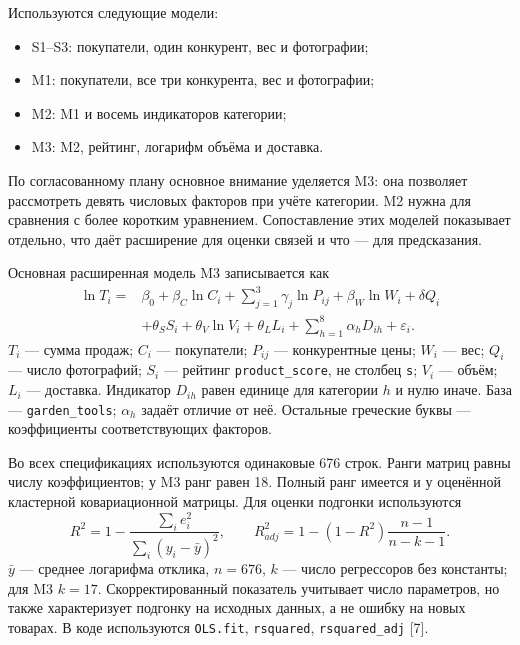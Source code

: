 \documentclass[14pt,a4paper]{extreport}
\newcommand{\resulttable}[3]{%
\begin{table}[htbp]\centering\small\singlespacing
\caption{#2}\label{#3}
\end{table}}
\begin{document}
Используются следующие модели:
\begin{itemize}
\item S1--S3: покупатели, один конкурент, вес и фотографии;
\item M1: покупатели, все три конкурента, вес и фотографии;
\item M2: M1 и восемь индикаторов категории;
\item M3: M2, рейтинг, логарифм объёма и доставка.
\end{itemize}

По согласованному плану основное внимание уделяется M3: она позволяет рассмотреть девять числовых факторов при учёте категории. M2 нужна для сравнения с более коротким уравнением. Сопоставление этих моделей показывает отдельно, что даёт расширение для оценки связей и что --- для предсказания.

Основная расширенная модель M3 записывается как
\begin{equation}\begin{split}
 \ln T_i={}&\beta_0+\beta_C\ln C_i+\sum_{j=1}^{3}\gamma_j\ln P_{ij}
 +\beta_W\ln W_i+\delta Q_i\\
 &+\theta_S S_i+\theta_V\ln V_i+\theta_L L_i
 +\sum_{h=1}^{8}\alpha_h D_{ih}+\varepsilon_i.
\end{split}\label{eq:main}\end{equation}
$T_i$ --- сумма продаж; $C_i$ --- покупатели; $P_{ij}$ --- конкурентные цены; $W_i$ --- вес; $Q_i$ --- число фотографий; $S_i$ --- рейтинг \texttt{product\_score}, не столбец \texttt{s}; $V_i$ --- объём; $L_i$ --- доставка. Индикатор $D_{ih}$ равен единице для категории $h$ и нулю иначе. База --- \texttt{garden\_tools}; $\alpha_h$ задаёт отличие от неё. Остальные греческие буквы --- коэффициенты соответствующих факторов.

Во всех спецификациях используются одинаковые 676 строк. Ранги матриц равны числу коэффициентов; у M3 ранг равен 18. Полный ранг имеется и у оценённой кластерной ковариационной матрицы. Для оценки подгонки используются
\begin{equation}
 R^2=1-\frac{\sum_i e_i^2}{\sum_i(y_i-\bar y)^2},\qquad
 R^2_{adj}=1-(1-R^2)\frac{n-1}{n-k-1}.
\end{equation}
$\bar y$ --- среднее логарифма отклика, $n=676$, $k$ --- число регрессоров без константы; для M3 $k=17$. Скорректированный показатель учитывает число параметров, но также характеризует подгонку на исходных данных, а не ошибку на новых товарах. В коде используются \texttt{OLS.fit}, \texttt{rsquared}, \texttt{rsquared\_adj} [7].
\resulttable{models}{Подгонка моделей на общей выборке}{tab:models}
\end{document}

